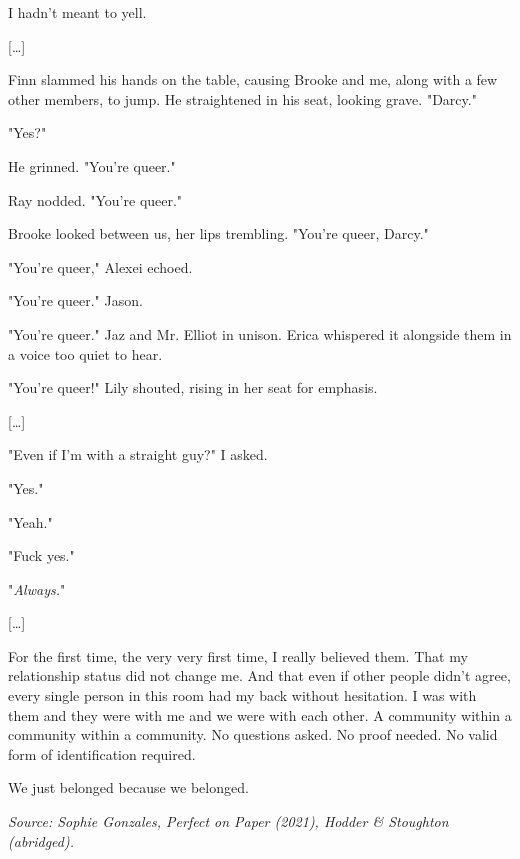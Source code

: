 \documentclass[10pt,a4paper]{article}
\begin{document}
I hadn't meant to yell.

[\ldots]

Finn slammed his hands on the table, causing Brooke and me, along with a few other members, to jump. He straightened in his seat, looking grave. "Darcy."

"Yes?"

He grinned. "You're queer."

Ray nodded. "You're queer."

Brooke looked between us, her lips trembling. "You're queer, Darcy."

"You're queer," Alexei echoed.

"You're queer." Jason.

"You're queer." Jaz and Mr. Elliot in unison. Erica whispered it alongside them in a voice too quiet to hear.

"You're queer!" Lily shouted, rising in her seat for emphasis.

[\ldots]

"Even if I'm with a straight guy?" I asked.

"Yes."

"Yeah."

"Fuck yes."

"\emph{Always.}"

[\ldots]

For the first time, the very very first time, I really believed them. That my relationship status did not change me. And that even if other people didn't agree, every single person in this room had my back without hesitation. I was with them and they were with me and we were with each other. A community within a community within a community. No questions asked. No proof needed. No valid form of identification required.

We just belonged because we belonged.

\bigskip
\noindent\textit{Source: Sophie Gonzales, \textit{Perfect on Paper} (2021), Hodder \& Stoughton (abridged).}
\end{document}
